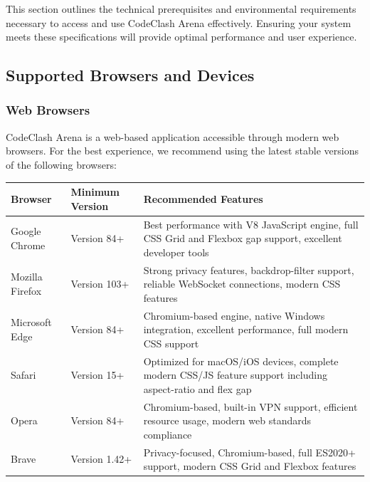 \documentclass[12pt,a4paper]{article}
\begin{document}
This section outlines the technical prerequisites and environmental requirements necessary to access and use CodeClash Arena effectively. Ensuring your system meets these specifications will provide optimal performance and user experience.

\subsection{Supported Browsers and Devices}

\subsubsection{Web Browsers}

CodeClash Arena is a web-based application accessible through modern web browsers. For the best experience, we recommend using the latest stable versions of the following browsers:

\begin{longtable}{|p{3cm}|p{3cm}|p{7.5cm}|}
\hline
\textbf{Browser} & \textbf{Minimum Version} & \textbf{Recommended Features} \\
\hline
\endhead

Google Chrome & Version 84+ & Best performance with V8 JavaScript engine, full CSS Grid and Flexbox gap support, excellent developer tools \\
\hline

Mozilla Firefox & Version 103+ & Strong privacy features, backdrop-filter support, reliable WebSocket connections, modern CSS features \\
\hline

Microsoft Edge & Version 84+ & Chromium-based engine, native Windows integration, excellent performance, full modern CSS support \\
\hline

Safari & Version 15+ & Optimized for macOS/iOS devices, complete modern CSS/JS feature support including aspect-ratio and flex gap \\
\hline

Opera & Version 84+ & Chromium-based, built-in VPN support, efficient resource usage, modern web standards compliance \\
\hline

Brave & Version 1.42+ & Privacy-focused, Chromium-based, full ES2020+ support, modern CSS Grid and Flexbox features \\
\hline

\end{longtable}
\end{document}
